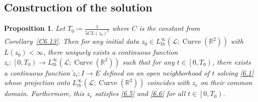\documentclass[reqno,centertags,12pt]{amsart}
\newtheorem{proposition}[theorem]{Proposition}
\theoremstyle{definition}
\numberwithin{equation}{section}
\newcommand{\bbR}{{\mathbb{R}}}
\begin{document}
\subsection{Construction of the solution}

\begin{proposition}\label{P6.14}
    Let $T_{0} \coloneqq \frac{1}{5CL(z_{0})^{5}}$
    where $C$ is the constant from Corollary~\ref{C6.13}.
    Then for any initial data
    $z_{0}\in L_{tb}^{\infty}(\mathcal{L};\operatorname{Curve}(\bbR^{2}))$
    with $L(z_{0}) < \infty$, there uniquely exists a continuous function
    $z_{\epsilon}\colon \left[0, T_{0}\right)
    \to L_{tb}^{\infty}(\mathcal{L};\operatorname{Curve}(\bbR^{2}))$
    such that for any $t\in \left[0, T_{0}\right)$,
    there exists a continuous function $\tilde{z}_{\epsilon}\colon I\to E$
    defined on an open neighborhood of $t$ solving
    \eqref{6.1} whose projection onto
    $L_{tb}^{\infty}(\mathcal{L};\operatorname{Curve}(\bbR^{2}))$
    coincides with $z_{\epsilon}$ on their common domain.
    Furthermore, this $z_{\epsilon}$ satisfies \eqref{6.5}
    and \eqref{6.6}
    for all $t\in\left[0,T_{0}\right)$.
\end{proposition}
\end{document}
